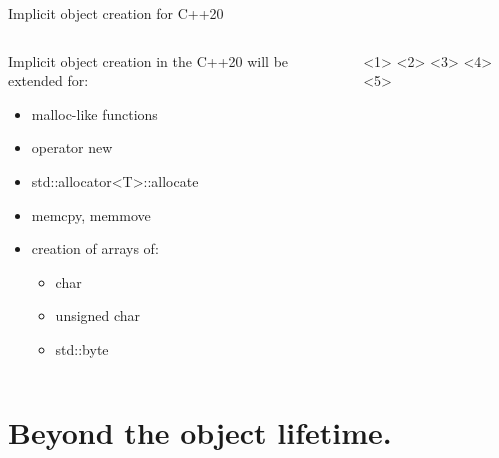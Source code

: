 \documentclass{panicsoftware-presentation}
\makeatletter
\newenvironment{itemizeSeq}{\begin{itemize}[<+-|alert@+>]}{\end{itemize}}
\makeatother
\begin{document}
\begin{frame}{Implicit object creation for C++20}

\begin{columns}

\begin{column}{0.45\linewidth}


Implicit object creation in the C++20 will be extended for:

\begin{itemizeSeq}

\item malloc-like functions
\item operator new
\item std::allocator<T>::allocate
\item memcpy, memmove
\item creation of arrays of:
\begin{itemize}[<5->]
	\item char
	\item unsigned char
	\item std::byte
\end{itemize}

\end{itemizeSeq}

\end{column}

\begin{column}{0.55\linewidth}

<1>
<2>
<3>
<4>
<5>

\end{column}

\end{columns}


\end{frame}

\section{Beyond the object lifetime.}
\end{document}
